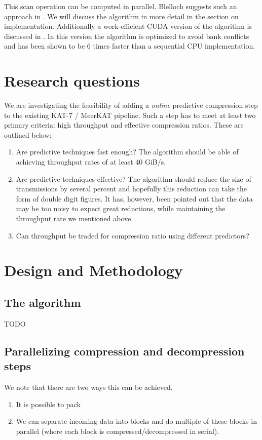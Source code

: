\documentclass{acm_proc_article-sp}
\begin{document}
This scan operation can be computed in parallel. Blelloch suggests such an approach in \cite{blelloch1990prefix}. We will discuss the algorithm in more detail in the section on implementation.
Additionally a work-efficient CUDA version of the algorithm is discussed in \cite{harris2007parallel}. In this version the algorithm is optimized to avoid bank conflicts and has been
shown to be 6 times faster than a sequential CPU implementation.
\section{Research questions}
We are investigating the feasibility of adding a \textit{online} predictive compression step to the existing KAT-7 / MeerKAT pipeline. Such a step has to meet at least two primary
criteria: high throughput and effective compression ratios. These are outlined below:
\begin{enumerate}
 \item Are predictive techniques fast enough? The algorithm should be able of achieving throughput rates of at least 40 GiB/s.
 \item Are predictive techniques effective? The algorithm should reduce the size of transmissions by several percent and hopefully
       this reduction can take the form of double digit figures. It has, however, been pointed out that the data may
       be too noisy to expect great reductions, while maintaining the throughput rate we mentioned above.
 \item Can throughput be traded for compression ratio using different predictors?
\end{enumerate}
\section{Design and Methodology}
\subsection{The algorithm}
{\color{red}TODO}
\subsection{Parallelizing compression and decompression steps}
We note that there are two ways this can be achieved. 
\begin{enumerate}
 \item It is possible to pack 
 \item We can separate incoming data into blocks and do multiple of these blocks in parallel (where each block is compressed/decompressed in serial).
\end{enumerate}
\end{document}
